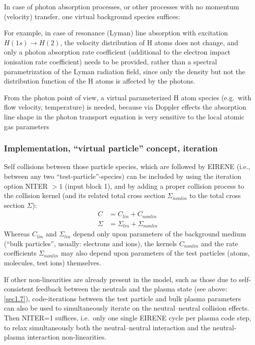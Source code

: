 In case of photon absorption processes, or other processes with no momentum
(velocity) transfer, one virtual background species suffices:

For example, in case of resonance (Lyman) line absorption with excitation
$H(1s) \rightarrow H(2)$, the velocity distribution of H atoms does not change,
and only a photon absorption rate coefficient (additional to the electron
impact ionisation rate coefficient) needs to be provided, rather than a
spectral parametrization of the Lyman radiation field, since only the density
but not the distribution function of the H atoms is affected by the photons.

From the photon point of view, a virtual parameterized H atom species (e.g.\
with flow velocity, temperature) is needed, because via Doppler effects the
absorption line shape in the photon transport equation is very sensitive to the
local atomic gas parameters   

\subsubsection{Implementation, ``virtual particle'' concept, iteration}

Self collisions between those particle species, which are followed by EIRENE
(i.e., between any two ``test-particle''-species) can be included by using the
iteration option NITER $> 1$  (input block 1), and by adding a proper collision
process to the collision kernel (and its related total cross section
$\Sigma_{nonlin}$ to the total cross section $\Sigma$):
\begin{align}
  C      & = C_{lin} + C_{nonlin}           \\
  \Sigma & = \Sigma_{lin} + \Sigma_{nonlin}
\end{align}
Whereas $C_{lin}$ and $\Sigma_{lin}$ depend only upon parameters of the
background medium (``bulk particles'', usually: electrons and ions), the
kernels $C_{nonlin}$ and the rate coefficients $\Sigma_{nonlin}$ may also
depend upon parameters of the test particles (atoms, molecules, test ions)
themselves.

If other non-linearities are already present in the model, such as those due to
self-consistent feedback between the neutrals and the plasma state (see above:
\cref{sec1.7}), code-iterations between the test particle and bulk plasma
parameters can also be used to simultaneously iterate on the neutral--neutral
collision effects.
Then NITER=1 suffices, i.e.\ only one single EIRENE cycle per plasma code step,
to relax simultaneously both the neutral--neutral interaction and the
neutral-plasma interaction non-linearities.

